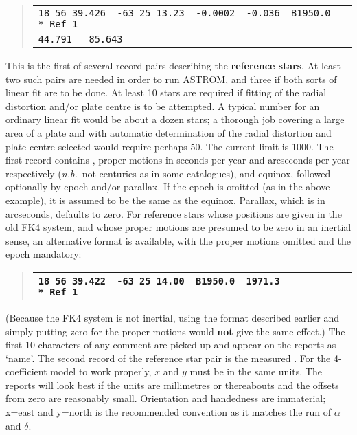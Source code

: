 \goodbreak
\begin{quote}
\begin{tabular}{|l|}
\hline
\verb|18 56 39.426  -63 25 13.23  -0.0002  -0.036  B1950.0  * Ref 1| \\
\verb|44.791   85.643| \\
\hline
\end{tabular}
\end{quote}
This is the first of several record pairs describing the
{\bf reference stars}.  At least two such pairs are needed in
order to run ASTROM, and three if both sorts of linear fit are to
be done.  At least 10 stars are required if fitting of the
radial distortion and/or plate centre is to be attempted.  A typical
number for an ordinary linear fit would be about a dozen stars;
a thorough job covering a large area of a plate and with
automatic determination of the radial distortion and plate centre
selected would require perhaps 50.
The current limit is 1000.
The first record contains \radec, proper
motions in seconds per year and arcseconds per year
respectively ({\it n.b.}\ not centuries as in some
catalogues), and equinox, followed optionally by
epoch and/or parallax.  If the epoch is omitted (as in the above example),
it is assumed to be the same as the equinox.  Parallax, which is
in arcseconds, defaults to zero.  For reference
stars whose positions are given in the old
FK4 system, and whose proper motions are presumed to be zero in an
inertial sense, an alternative format is available,
with the proper motions omitted and the epoch mandatory:
\begin{quote}
\begin{tabular}{|l|}
\hline
\verb|18 56 39.422  -63 25 14.00  B1950.0  1971.3           * Ref 1| \\
\hline
\end{tabular}
\end{quote}
(Because the FK4 system is not inertial, using the
format described earlier and simply putting zero for the
proper motions would {\bf not} give the same effect.)  The
first 10 characters of any comment
are picked up and appear on the reports as `name'.
The second record of the reference star pair is the
measured \xy.  For the 4-coefficient model to
work properly, $x$ and $y$ must be in the same units.
The reports will look best if the units are millimetres or
thereabouts and the offsets from zero are reasonably small.
Orientation and handedness are immaterial; x=east and y=north
is the recommended convention as it matches the run of $\alpha$ and
$\delta$.

